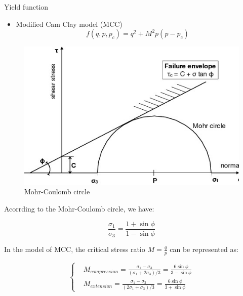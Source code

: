 \documentclass[aspectratio=169]{beamer}
\begin{document}
\begin{frame}{Yield function}
\begin{minipage}[c]{0.45\linewidth}
\begin{itemize}
	        \item Modified Cam Clay model (MCC)
	        \begin{equation}
	        	f(q, p, p_c) = q^2 + M^2 p(p-p_c)
	        	\label{eq: modified cam clay model}
	        \end{equation}
        \end{itemize}
    \end{minipage}
	\vspace{3mm}
    \begin{minipage}[c]{0.52\linewidth}
    	\begin{figure}
    		\centering
    		\includegraphics[width=0.5\linewidth]{./pic/The-Mohr-Coulomb-failure-criteria-and-Mohrs-circle.png}
    		\caption{Mohr-Coulomb circle}
    		\label{fig: Mohr-Coulomb circle}
    	\end{figure}
    	\vspace{-5mm}
    	Acorrding to the Mohr-Coulomb circle, we have:
    	
    	\vspace{-2mm}
    	\begin{equation}
    		\frac{\sigma_1}{\sigma_3} = \frac{1+\sin \phi}{1-\sin \phi}
    	\label{eq: mohr circle}
    \end{equation}

	\vspace{-2mm}
    	In the model of MCC, the critical stress ratio $M = \frac{q}{p}$ can be represented as:
    	
    	\vspace{-2mm}
    	\begin{equation}
    		\left \{ \begin{aligned}
    			&M_{compression}= \frac{\sigma_1 - \sigma_3}{(\sigma_1+2\sigma_3)/3} = \frac{6\sin \phi}{3-\sin \phi}\\
    			&M_{extension}= \frac{\sigma_1 - \sigma_3}{(2\sigma_1+\sigma_3)/3} = \frac{6\sin \phi}{3+\sin \phi}
    		\end{aligned} 
    		\right.
    		\label{eq: M calculation}
    	\end{equation}
    \end{minipage}
\end{frame}
\end{document}
